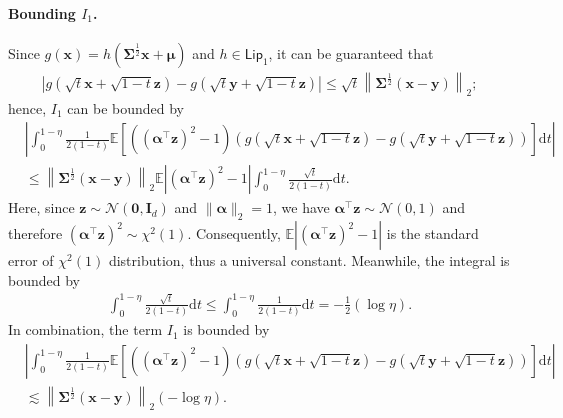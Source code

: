 \paragraph{Bounding $I_1$.} Since $g(\bm{x}) = h(\bm{\Sigma}^{\frac{1}{2}}\bm{x}+\bm{\mu})$ and $h \in \mathsf{Lip}_1$, it can be guaranteed that
\begin{align*}
\left|g(\sqrt{t}\bm{x}+\sqrt{1-t}\bm{z})-g(\sqrt{t}\bm{y}+\sqrt{1-t}\bm{z})\right| \leq \sqrt{t}\left\|\bm{\Sigma}^{\frac{1}{2}}(\bm{x} - \bm{y})\right\|_2;
\end{align*}
hence, $I_1$ can be bounded by
\begin{align*}
&\left|\int_0^{1-\eta} \frac{1}{2(1-t)}\mathbb{E}\left[((\bm{\alpha}^\top \bm{z})^2 -1)\left(g(\sqrt{t}\bm{x}+\sqrt{1-t}\bm{z})-g(\sqrt{t}\bm{y}+\sqrt{1-t}\bm{z})\right)\right] \mathrm{d}t\right| \\ 
&\leq \left\|\bm{\Sigma}^{\frac{1}{2}}(\bm{x} - \bm{y})\right\|_2 \mathbb{E}\left|(\bm{\alpha}^\top \bm{z})^2-1\right| \int_0^{1-\eta} \frac{\sqrt{t}}{2(1-t)}\mathrm{d}t.
\end{align*}
Here, since $\bm{z} \sim \mathcal{N}(\bm{0},\bm{I}_d)$ and $\|\bm{\alpha}\|_2 = 1$, we have $\bm{\alpha}^\top \bm{z} \sim \mathcal{N}(0,1)$ and therefore $(\bm{\alpha}^\top \bm{z})^2 \sim \chi^2(1)$. Consequently, $\mathbb{E}\left|(\bm{\alpha}^\top \bm{z})^2-1\right|$ is the standard error of $\chi^2(1)$ distribution, thus a universal constant. Meanwhile, the integral is bounded by
\begin{align*}
\int_0^{1-\eta} \frac{\sqrt{t}}{2(1-t)}\mathrm{d}t \leq \int_0^{1-\eta} \frac{1}{2(1-t)}\mathrm{d}t=-\frac{1}{2}(\log \eta).
\end{align*}
In combination, the term $I_1$ is bounded by
\begin{align}\label{eq:Stein-smooth-I1}
&\left|\int_0^{1-\eta} \frac{1}{2(1-t)}\mathbb{E}\left[((\bm{\alpha}^\top \bm{z})^2 -1)\left(g(\sqrt{t}\bm{x}+\sqrt{1-t}\bm{z})-g(\sqrt{t}\bm{y}+\sqrt{1-t}\bm{z})\right)\right] \mathrm{d}t\right| \nonumber \\ 
&\lesssim \left\|\bm{\Sigma}^{\frac{1}{2}}(\bm{x} - \bm{y})\right\|_2 (-\log \eta).
\end{align}

